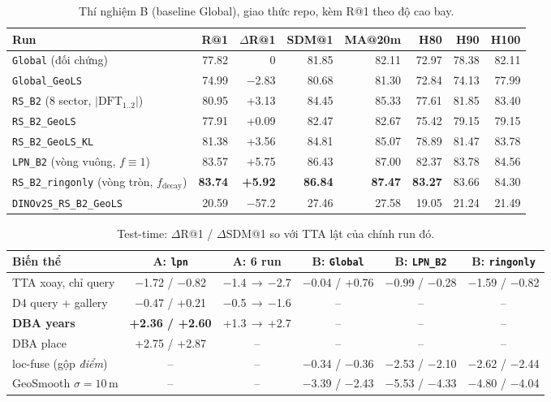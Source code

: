 \documentclass[11pt,a4paper]{article}
\newcommand{\run}[1]{\texttt{#1}}
\begin{document}
\begin{table}[h]\centering\small
\caption{Thí nghiệm B (baseline Global), giao thức repo, kèm R@1 theo độ cao bay.}\label{tab:B}
\begin{tabular}{@{}lrrrrrrr@{}}\toprule
Run & R@1 & $\Delta$R@1 & SDM@1 & MA@20m & H80 & H90 & H100\\\midrule
\run{Global} (đối chứng) & 77.82 & 0 & 81.85 & 82.11 & 72.97 & 78.38 & 82.11\\
\run{Global\_GeoLS} & 74.99 & $-$2.83 & 80.68 & 81.30 & 72.84 & 74.13 & 77.99\\
\run{RS\_B2} (8 sector, $|\mathrm{DFT}_{1..2}|$) & 80.95 & +3.13 & 84.45 & 85.33 & 77.61 & 81.85 & 83.40\\
\run{RS\_B2\_GeoLS} & 77.91 & +0.09 & 82.47 & 82.67 & 75.42 & 79.15 & 79.15\\
\run{RS\_B2\_GeoLS\_KL} & 81.38 & +3.56 & 84.81 & 85.07 & 78.89 & 81.47 & 83.78\\
\run{LPN\_B2} (vòng vuông, $f\equiv1$) & 83.57 & +5.75 & 86.43 & 87.00 & 82.37 & 83.78 & 84.56\\
\run{RS\_B2\_ringonly} (vòng tròn, $f_{\mathrm{decay}}$) & \textbf{83.74} & \textbf{+5.92} & \textbf{86.84} & \textbf{87.47} & \textbf{83.27} & 83.66 & 84.30\\
\run{DINOv2S\_RS\_B2\_GeoLS} & 20.59 & $-$57.2 & 27.46 & 27.58 & 19.05 & 21.24 & 21.49\\\bottomrule
\end{tabular}
\end{table}

\begin{table}[h]\centering\small
\caption{Test-time: $\Delta$R@1 / $\Delta$SDM@1 so với TTA lật của chính run đó.}\label{tab:tt}
\begin{tabular}{@{}lccccc@{}}\toprule
Biến thể & A: \run{lpn} & A: 6 run & B: \run{Global} & B: \run{LPN\_B2} & B: \run{ringonly}\\\midrule
TTA xoay, chỉ query & $-$1.72 / $-$0.82 & $-$1.4\,$\to$\,$-$2.7 & $-$0.04 / +0.76 & $-$0.99 / $-$0.28 & $-$1.59 / $-$0.82\\
D4 query + gallery & $-$0.47 / +0.21 & $-$0.5\,$\to$\,$-$1.6 & -- & -- & --\\
\textbf{DBA years} & \textbf{+2.36 / +2.60} & +1.3\,$\to$\,+2.7 & -- & -- & --\\
DBA place & +2.75 / +2.87 & -- & -- & -- & --\\
loc-fuse (gộp \emph{điểm}) & -- & -- & $-$0.34 / $-$0.36 & $-$2.53 / $-$2.10 & $-$2.62 / $-$2.44\\
GeoSmooth $\sigma=10$\,m & -- & -- & $-$3.39 / $-$2.43 & $-$5.53 / $-$4.33 & $-$4.80 / $-$4.04\\\bottomrule
\end{tabular}
\end{table}
\end{document}
